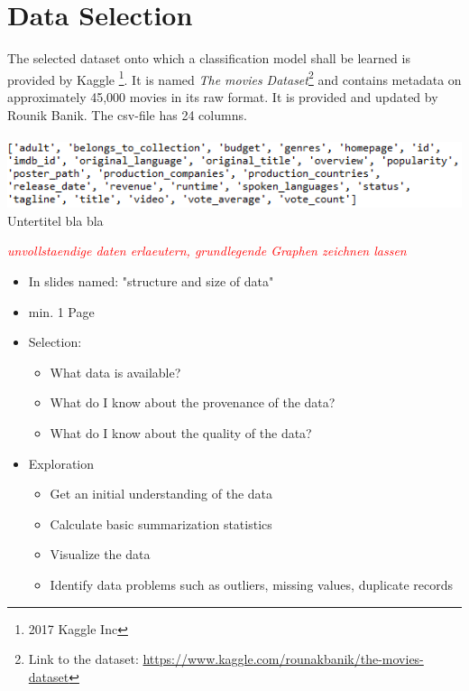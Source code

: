 \chapter{Data Selection}
\label{cha:data_selection}
The selected dataset onto which a classification model shall be learned is provided by Kaggle \footnote{2017 Kaggle Inc}. It is named \textit{The movies Dataset}\footnote{Link to the dataset: \hyperref[https://www.kaggle.com/rounakbanik/the-movies-dataset]{https://www.kaggle.com/rounakbanik/the-movies-dataset}} and contains metadata on approximately 45,000 movies in its raw format. It is provided and updated by Rounik Banik. The csv-file has 24 columns.\\\\
\includegraphics[width=\textwidth]{images/Raw_dataset_headers.png}
Untertitel bla bla


\textcolor{red}{\textit{unvollstaendige daten erlaeutern, grundlegende Graphen zeichnen lassen}}




\begin{itemize}
	\item In slides named: "structure and size of data"
	\item min. 1 Page
	\item Selection: 
	\begin{itemize}
		\item What data is available?
		\item What do I know about the provenance of the data?
		\item What do I know about the quality of the data?
	\end{itemize}
	\item Exploration
	\begin{itemize}
		\item Get an initial understanding of the data
		\item Calculate basic summarization statistics
		\item Visualize the data
		\item Identify data problems such as outliers, missing values, duplicate records
	\end{itemize}
\end{itemize}

